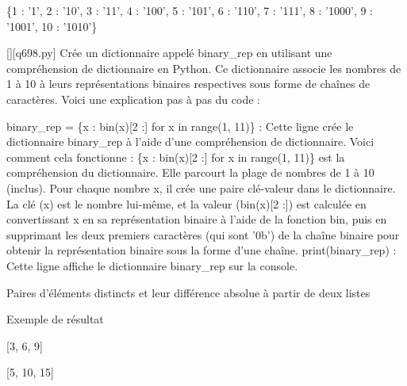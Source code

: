 \{1 : '1', 2 : '10', 3 : '11', 4 : '100', 5 : '101', 6 : '110', 7 : '111', 8 : '1000', 9 : '1001', 10 : '1010'\}
        \par
        \begin{solution}
            \renewcommand{\nomfichier}{q698.py}
            \pythonfile{\chemincode \nomfichier}[][\nomfichier]
            Crée un dictionnaire appelé binary\_rep en utilisant une compréhension de dictionnaire en Python. Ce dictionnaire associe les nombres de 1 à 10 à leurs représentations binaires respectives sous forme de chaînes de caractères. Voici une explication pas à pas du code :

    binary\_rep = \{x : bin(x)[2 :] for x in range(1, 11)\} : Cette ligne crée le dictionnaire binary\_rep à l'aide d'une compréhension de dictionnaire. Voici comment cela fonctionne :
        \{x : bin(x)[2 :] for x in range(1, 11)\} est la compréhension du dictionnaire. Elle parcourt la plage de nombres de 1 à 10 (inclus).
        Pour chaque nombre x, il crée une paire clé-valeur dans le dictionnaire. La clé (x) est le nombre lui-même, et la valeur (bin(x)[2 :]) est calculée en convertissant x en sa représentation binaire à l'aide de la fonction bin, puis en supprimant les deux premiers caractères (qui sont '0b') de la chaîne binaire pour obtenir la représentation binaire sous la forme d'une chaîne.
    print(binary\_rep) : Cette ligne affiche le dictionnaire binary\_rep sur la console.
        \end{solution}
        

        \question
        Paires d'éléments distincts et leur différence absolue à partir de deux listes

Exemple de résultat

[3, 6, 9]

[5, 10, 15]

